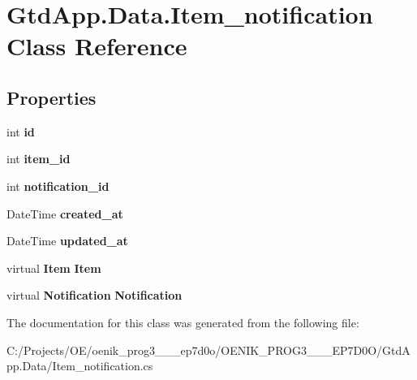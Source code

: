 \section{Gtd\+App.\+Data.\+Item\+\_\+notification Class Reference}
\label{class_gtd_app_1_1_data_1_1_item__notification}
\subsection*{Properties}
\begin{DoxyCompactItemize}
\item 
\mbox{\label{class_gtd_app_1_1_data_1_1_item__notification_a850039c5d6ffd051ea8d477b45e2be39}} 
int {\bfseries id}\hspace{0.3cm}{\ttfamily  [get, set]}
\item 
\mbox{\label{class_gtd_app_1_1_data_1_1_item__notification_afb93b9e12ee1cddc76891b1705b05233}} 
int {\bfseries item\+\_\+id}\hspace{0.3cm}{\ttfamily  [get, set]}
\item 
\mbox{\label{class_gtd_app_1_1_data_1_1_item__notification_a05754b688bd11599c3ebf0eb6d190868}} 
int {\bfseries notification\+\_\+id}\hspace{0.3cm}{\ttfamily  [get, set]}
\item 
\mbox{\label{class_gtd_app_1_1_data_1_1_item__notification_a26b174cb4188edb8538b4d876fee5f23}} 
Date\+Time {\bfseries created\+\_\+at}\hspace{0.3cm}{\ttfamily  [get, set]}
\item 
\mbox{\label{class_gtd_app_1_1_data_1_1_item__notification_a06fb278bf0d305484a8343bd1953fe77}} 
Date\+Time {\bfseries updated\+\_\+at}\hspace{0.3cm}{\ttfamily  [get, set]}
\item 
\mbox{\label{class_gtd_app_1_1_data_1_1_item__notification_aa845abf76eca7aaf57acd1b0ab3c5a54}} 
virtual \textbf{ Item} {\bfseries Item}\hspace{0.3cm}{\ttfamily  [get, set]}
\item 
\mbox{\label{class_gtd_app_1_1_data_1_1_item__notification_a66bf193a5fd35bf282336a961cc32584}} 
virtual \textbf{ Notification} {\bfseries Notification}\hspace{0.3cm}{\ttfamily  [get, set]}
\end{DoxyCompactItemize}


The documentation for this class was generated from the following file\+:\begin{DoxyCompactItemize}
\item 
C\+:/\+Projects/\+O\+E/oenik\+\_\+prog3\+\_\+\_\+\_\+ep7d0o/\+O\+E\+N\+I\+K\+\_\+\+P\+R\+O\+G3\+\_\+\_\+\_\+\+E\+P7\+D0\+O/\+Gtd\+App.\+Data/Item\+\_\+notification.\+cs\end{DoxyCompactItemize}
